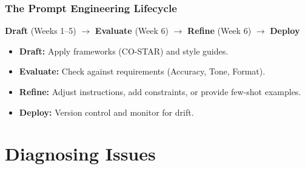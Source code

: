 \documentclass{beamer}
\begin{document}
\begin{frame}
    \frametitle{The Prompt Engineering Lifecycle}
    \begin{center}
        \textbf{Draft} (Weeks 1--5) $\to$ \textbf{Evaluate} (Week 6) $\to$ \textbf{Refine} (Week 6) $\to$ \textbf{Deploy}
    \end{center}
    \vspace{0.5cm}
    \begin{itemize}
        \item \textbf{Draft:} Apply frameworks (CO-STAR) and style guides.
        \item \textbf{Evaluate:} Check against requirements (Accuracy, Tone, Format).
        \item \textbf{Refine:} Adjust instructions, add constraints, or provide few-shot examples.
        \item \textbf{Deploy:} Version control and monitor for drift.
    \end{itemize}
\end{frame}

\section{Diagnosing Issues}
\end{document}
